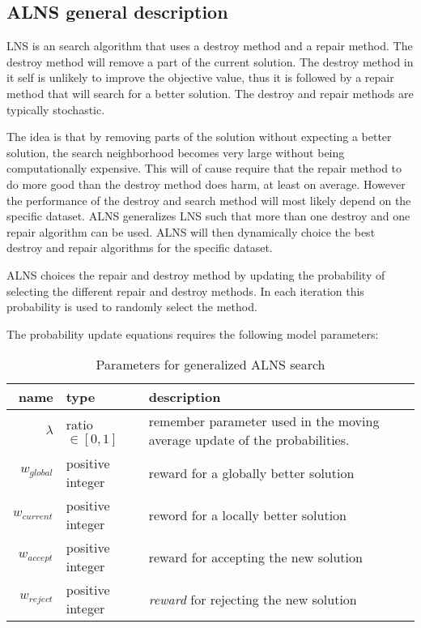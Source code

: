 \subsection{ALNS general description}

LNS is an search algorithm that uses a destroy method and a repair method. The destroy method will remove a part of the current solution. The destroy method in it self is unlikely to improve the objective value, thus it is followed by a repair method that will search for a better solution. The destroy and repair methods are typically stochastic.

The idea is that by removing parts of the solution without expecting a better solution, the search neighborhood becomes very large without being computationally expensive. This will of cause require that the repair method to do more good than the destroy method does harm, at least on average. However the performance of the destroy and search method will most likely depend on the specific dataset. ALNS generalizes LNS such that more than one destroy and one repair algorithm can be used. ALNS will then dynamically choice the best destroy and repair algorithms for the specific dataset.

ALNS choices the repair and destroy method by updating the probability of selecting the different repair and destroy methods. In each iteration this probability is used to randomly select the method.

The probability update equations requires the following model parameters:

\begin{table}[H]
\centering
\begin{tabular}{r|p{2.5cm}|p{6cm}}
	name & type & description \\ \hline
	$\lambda$ & ratio $\in [0, 1]$ & remember parameter used in the moving average update of the probabilities. \\
	$w_{global}$ & positive integer & reward for a globally better solution \\
	$w_{current}$ & positive integer & reword for a locally better solution \\
	$w_{accept}$ & positive integer & reward for accepting the new solution \\
	$w_{reject}$ & positive integer & \textit{reward} for rejecting the new solution
\end{tabular}
\caption{Parameters for generalized ALNS search}
\end{table}

